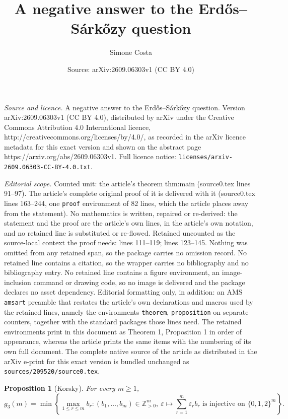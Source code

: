 \documentclass[10pt,a4paper]{amsart}
\title{A negative answer to the Erd\H{o}s--S\'ark\H{o}zy question}
\author{Simone Costa}
\date{Source: arXiv:2609.06303v1 (CC BY 4.0)}
\newtheorem{proposition}{Proposition}
\newcommand{\Z}{\mathbb Z}
\begin{document}
\maketitle

\noindent\emph{Source and licence.} A negative answer to the Erd\H{o}s--S\'ark\H{o}zy question. Version arXiv:2609.06303v1 (CC BY 4.0), distributed by arXiv under the Creative Commons Attribution 4.0 International licence, http://creativecommons.org/licenses/by/4.0/, as recorded in the arXiv licence metadata for this exact version and shown on the abstract page https://arxiv.org/abs/2609.06303v1. Full licence notice: \texttt{licenses/arxiv-2609.06303-CC-BY-4.0.txt}.\par\smallskip

\noindent\textit{Editorial scope.} Counted unit: the article's theorem thm:main (source0.tex lines 91--97). The article's complete original proof of it is delivered with it (source0.tex lines 163--244, one \texttt{proof} environment of 82 lines, which the article places away from the statement). No mathematics is written, repaired or re-derived: the statement and the proof are the article's own lines, in the article's own notation, and no retained line is substituted or re-flowed.  Retained uncounted as the source-local context the proof needs: lines 111--119; lines 123--145.  Nothing was omitted from any retained span, so the package carries no omission record.  No retained line contains a citation, so the wrapper carries no bibliography and no bibliography entry.  No retained line contains a figure environment, an image-inclusion command or drawing code, so no image is delivered and the package declares no asset dependency.  Editorial formatting only, in addition: an AMS \texttt{amsart} preamble that restates the article's own declarations and macros used by the retained lines, namely the environments \texttt{theorem}, \texttt{proposition} on separate counters, together with the standard packages those lines need.  The retained environments print in this document as Theorem 1, Proposition 1 in order of appearance, whereas the article prints the same items with the numbering of its own full document.  The complete native source of the article as distributed in the arXiv e-print for this exact version is bundled unchanged as \texttt{sources/209520/source0.tex}.
\begin{proposition}[Korsky]\label{prop:korsky}
For every $m\ge1$,
\[
 g_3(m)=\min\left\{\max_{1\le r\le m}b_r:
 (b_1,\ldots,b_m)\in\Z_{>0}^m,\ 
 \varepsilon\longmapsto\sum_{r=1}^m\varepsilon_r b_r
 \text{ is injective on }\{0,1,2\}^m\right\}.
\]
\end{proposition}
\end{document}
